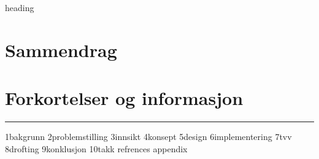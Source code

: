 \documentclass[a4paper,11pt,norsk]{article}
\begin{document}
{heading}
\section*{Sammendrag}
\section*{Forkortelser og informasjon}
\rule{\textwidth}{1pt}
{1bakgrunn}
{2problemstilling}
{3innsikt}
{4konsept}
{5design}    
{6implementering}
{7tvv}
{8drofting}
{9konklusjon}
{10takk}
{refrences}
{appendix}
\def\Projectname{EyeText}
\end{document}
